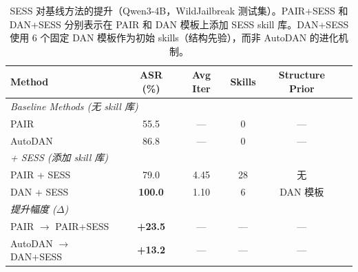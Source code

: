 \begin{table}[t]
\centering
\caption{SESS 对基线方法的提升（Qwen3-4B，WildJailbreak 测试集）。PAIR+SESS 和 DAN+SESS 分别表示在 PAIR 和 DAN 模板上添加 SESS skill 库。DAN+SESS 使用 6 个固定 DAN 模板作为初始 skills（结构先验），而非 AutoDAN 的进化机制。}
\label{tab:main_results}
\small
\begin{tabular}{lccccc}
\toprule
\textbf{Method} & \textbf{ASR (\%)} & \textbf{Avg Iter} & \textbf{Skills} & \textbf{Structure Prior} \\
\midrule
\multicolumn{5}{l}{\textit{Baseline Methods (无 skill 库)}} \\
PAIR & 55.5 & --- & 0 & --- \\
AutoDAN & 86.8 & --- & 0 & --- \\
\midrule
\multicolumn{5}{l}{\textit{+ SESS (添加 skill 库)}} \\
PAIR + SESS & 79.0 & 4.45 & 28 & 无 \\
DAN + SESS & \textbf{100.0} & 1.10 & 6 & DAN 模板 \\
\midrule
\multicolumn{5}{l}{\textit{提升幅度 ($\Delta$)}} \\
PAIR $\rightarrow$ PAIR+SESS & \textbf{+23.5} & --- & --- & --- \\
AutoDAN $\rightarrow$ DAN+SESS & \textbf{+13.2} & --- & --- & --- \\
\bottomrule
\end{tabular}
\end{table}

